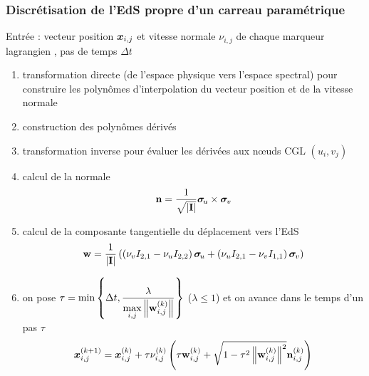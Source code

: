 \subsubsection{Discrétisation de l'EdS propre d'un carreau paramétrique}
\label{section:discretisation_EdS_propre_carreau}
Entrée : vecteur position $\boldsymbol{x}_{i,j}$ et vitesse normale $\nu_{i,j}$ de chaque marqueur lagrangien , pas de temps $\Delta t$
\begin{enumerate}
	\item transformation directe (de l'espace physique vers l'espace spectral) pour construire les polynômes d'interpolation du vecteur position et de la vitesse normale
	\item construction des polynômes dérivés 
	\item transformation inverse pour évaluer les dérivées aux n\oe uds CGL $(u_i,v_j)$
	\item calcul de la normale 
	\begin{equation}
		\mathbf{n} = \frac{1}{\sqrt{\left\lvert {\mathbf{I}} \right\rvert}} {\boldsymbol{\sigma}_{\mkern-3muu}} \times {\boldsymbol{\sigma}_{\mkern-2muv}}
	\end{equation}
	\item calcul de la composante tangentielle du déplacement vers l'EdS
	\begin{equation}
		\mathbf{w} = \frac{1}{\left\lvert {\mathbf{I}} \right\rvert} 
		\left(
			\left( \nu_v I_{2,1} - \nu_u I_{2,2} \right)\boldsymbol{\sigma}_{\mkern-3muu} + 
			\left( \nu_u I_{2,1} - \nu_v I_{1,1} \right)\boldsymbol{\sigma}_{\mkern-2muv}
		\right)
	\end{equation}
	\item on pose $\tau = \min\left\{\Delta t, \displaystyle\frac{\lambda}{\displaystyle\max_{i,j} \left\| {\mathbf{w}_{i,j}^{(k)} } \right\|} \right\}$ ($\lambda \leq 1$) et on avance dans le temps d'un pas $\tau$
	\begin{equation}
		\boldsymbol{x}_{i,j}^{(k+1)} = \boldsymbol{x}_{i,j}^{(k)} + \tau \nu_{i,j}^{(k)} 
		\left( 
			\tau \mathbf{w}_{i,j}^{(k)} + \sqrt{1 - \tau^2 \left\| {\mathbf{w}_{i,j}^{(k)}} \right\|^2} \mathbf{n}_{i,j}^{(k)}
		\right)
	\end{equation}
\end{enumerate}

